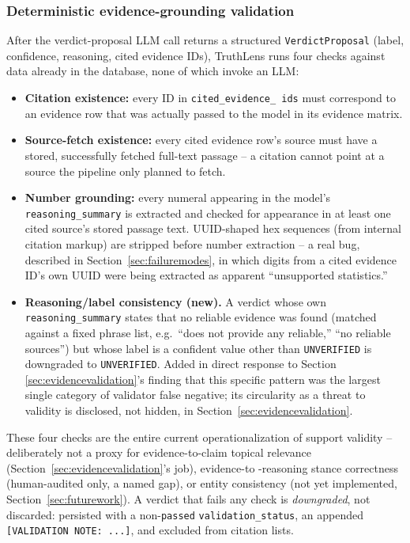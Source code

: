 \documentclass[conference]{IEEEtran}
\begin{document}
\subsubsection{Deterministic evidence-grounding validation}
\label{sec:validation}
After the verdict-proposal LLM call returns a structured
\texttt{VerdictProposal} (label, confidence, reasoning, cited evidence
IDs), TruthLens runs four checks against data already in the database, none
of which invoke an LLM:

\begin{itemize}
\item \textbf{Citation existence:} every ID in \texttt{cited\_evidence\_
  ids} must correspond to an evidence row that was actually passed to the
  model in its evidence matrix.
\item \textbf{Source-fetch existence:} every cited evidence row's source
  must have a stored, successfully fetched full-text passage -- a citation
  cannot point at a source the pipeline only planned to fetch.
\item \textbf{Number grounding:} every numeral appearing in the model's
  \texttt{reasoning\_summary} is extracted and checked for appearance in at
  least one cited source's stored passage text. UUID-shaped hex sequences
  (from internal citation markup) are stripped before number extraction --
  a real bug, described in Section~\ref{sec:failuremodes}, in which digits
  from a cited evidence ID's own UUID were being extracted as apparent
  ``unsupported statistics.''
\item \textbf{Reasoning/label consistency (new).} A verdict whose own
  \texttt{reasoning\_summary} states that no reliable evidence was found
  (matched against a fixed phrase list, e.g.\ ``does not provide any
  reliable,'' ``no reliable sources'') but whose label is a confident
  value other than \texttt{UNVERIFIED} is downgraded to
  \texttt{UNVERIFIED}. Added in direct response to Section
  \ref{sec:evidencevalidation}'s finding that this specific pattern was
  the largest single category of validator false negative; its
  circularity as a threat to validity is disclosed, not hidden, in
  Section~\ref{sec:evidencevalidation}.
\end{itemize}

These four checks are the entire current operationalization of support
validity -- deliberately not a proxy for evidence-to-claim topical
relevance (Section~\ref{sec:evidencevalidation}'s job), evidence-to
-reasoning stance correctness (human-audited only, a named gap), or
entity consistency (not yet implemented, Section~\ref{sec:futurework}). A
verdict that fails any check is \emph{downgraded}, not discarded:
persisted with a non-\texttt{passed} \texttt{validation\_status}, an
appended \texttt{[VALIDATION NOTE: ...]}, and excluded from citation
lists.
\end{document}
